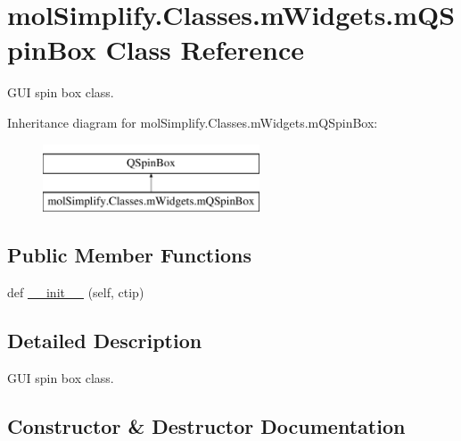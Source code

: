 \hypertarget{classmolSimplify_1_1Classes_1_1mWidgets_1_1mQSpinBox}{}\section{mol\+Simplify.\+Classes.\+m\+Widgets.\+m\+Q\+Spin\+Box Class Reference}
\label{classmolSimplify_1_1Classes_1_1mWidgets_1_1mQSpinBox}


G\+UI spin box class.  


Inheritance diagram for mol\+Simplify.\+Classes.\+m\+Widgets.\+m\+Q\+Spin\+Box\+:\begin{figure}[H]
\begin{center}
\leavevmode
\includegraphics[height=2.000000cm]{classmolSimplify_1_1Classes_1_1mWidgets_1_1mQSpinBox}
\end{center}
\end{figure}
\subsection*{Public Member Functions}
\begin{DoxyCompactItemize}
\item 
def \hyperlink{classmolSimplify_1_1Classes_1_1mWidgets_1_1mQSpinBox_a966601c99d3ba410e6a9937fb5d50bf9}{\+\_\+\+\_\+init\+\_\+\+\_\+} (self, ctip)
\end{DoxyCompactItemize}


\subsection{Detailed Description}
G\+UI spin box class. 

\subsection{Constructor \& Destructor Documentation}
\mbox{\label{classmolSimplify_1_1Classes_1_1mWidgets_1_1mQSpinBox_a966601c99d3ba410e6a9937fb5d50bf9}} 
